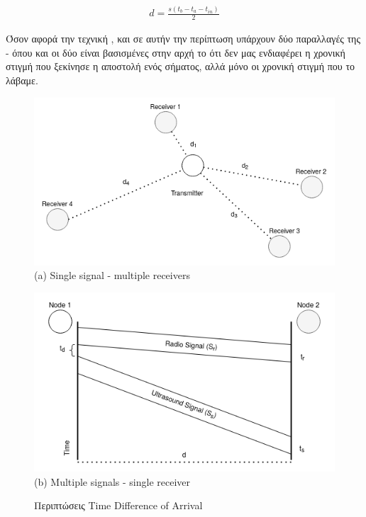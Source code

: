 \begin{align}
	d=\frac{s(t_b-t_a-t_{in})}{2} \label{eq:toa-roundtrip}
\end{align}


Όσον αφορά την τεχνική , και σε αυτήν την περίπτωση υπάρχουν δύο παραλλαγές της \cite{wsn-Localization-systems} - όπου και οι 
δύο είναι βασισμένες στην αρχή το ότι δεν μας ενδιαφέρει η χρονική στιγμή που ξεκίνησε η αποστολή ενός σήματος, αλλά μόνο
οι χρονική στιγμή που το λάβαμε.

\begin{figure} [H]
    \centering
    \begin{minipage}{.5\textwidth}
      \centering
      \includegraphics[width=0.8\linewidth]{../Photos/tdoa-multiple.png}\\
      {(a) Single signal - multiple receivers}
    \end{minipage}%
    \begin{minipage}{.5\textwidth}
      \centering
      \includegraphics[width=.8\linewidth]{../Photos/tdoa-timing.png}\\
      {(b) Multiple signals - single receiver}
    \end{minipage}
    \hfill \break
    \decoRule
    \caption[Περιπτώσεις Time Difference of Arrival]{Περιπτώσεις Time Difference of Arrival} %
    \label{fig:Time-Difference-of-Arrival-cases}
\end{figure}


